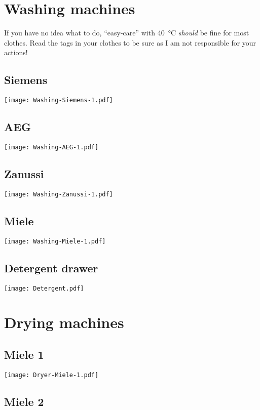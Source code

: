 \documentclass[10pt, english, fleqn, DIV=15, headinclude]{scrartcl}
\title{}
\author{
    Martin Ueding \\ \small{\href{mailto:mu@martin-ueding.de}{mu@martin-ueding.de}}
}
\begin{document}
\section*{Washing machines}

If you have no idea what to do, “easy-care” with \SI{40}{\celsius}
\emph{should} be fine for most clothes. Read the tags in your clothes to be
sure as I am not responsible for your actions!

\subsection*{Siemens}
\texttt{[image: Washing-Siemens-1.pdf]}

\subsection*{AEG}
\texttt{[image: Washing-AEG-1.pdf]}

\subsection*{Zanussi}
\texttt{[image: Washing-Zanussi-1.pdf]}

\subsection*{Miele}
\texttt{[image: Washing-Miele-1.pdf]}

\subsection*{Detergent drawer}

\texttt{[image: Detergent.pdf]}


\section*{Drying machines}

\subsection*{Miele 1}

\texttt{[image: Dryer-Miele-1.pdf]}

\subsection*{Miele 2}
\end{document}
